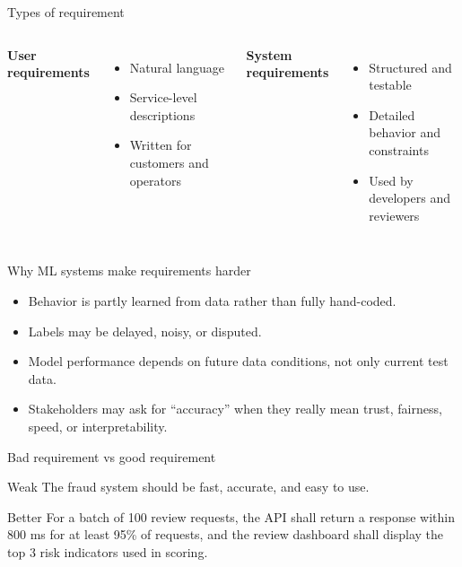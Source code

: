 \begin{frame}{Types of requirement}
\begin{columns}[T]
\textbf{User requirements}
\begin{itemize}
\item Natural language
\item Service-level descriptions
\item Written for customers and operators
\end{itemize}
\textbf{System requirements}
\begin{itemize}
\item Structured and testable
\item Detailed behavior and constraints
\item Used by developers and reviewers
\end{itemize}
\end{columns}
\coursefooter
\end{frame}

\begin{frame}{Why ML systems make requirements harder}
\begin{itemize}
\item Behavior is partly learned from data rather than fully hand-coded.
\item Labels may be delayed, noisy, or disputed.
\item Model performance depends on future data conditions, not only current test data.
\item Stakeholders may ask for ``accuracy'' when they really mean trust, fairness, speed, or interpretability.
\end{itemize}
\coursefooter
\end{frame}

\begin{frame}{Bad requirement vs good requirement}
\begin{block}{Weak}
The fraud system should be fast, accurate, and easy to use.
\end{block}
\begin{block}{Better}
For a batch of 100 review requests, the API shall return a response within 800 ms for at least 95\% of requests, and the review dashboard shall display the top 3 risk indicators used in scoring.
\end{block}
\coursefooter
\end{frame}

